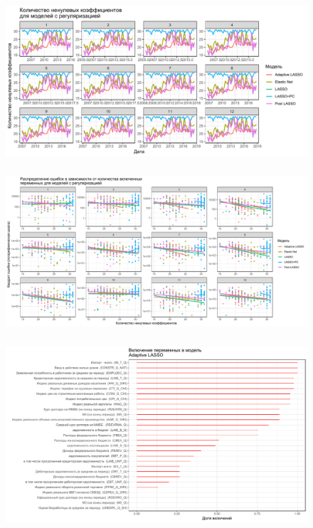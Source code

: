 \documentclass[c, dvipsnames]{beamer}  %
\begin{document}
 \begin{frame}
\frametitle{\insertsection} 
\framesubtitle{\insertsubsection}
\begin{figure}
\includegraphics[width=\linewidth]{nonzerotime.pdf}
\end{figure}
\end{frame} 


 \begin{frame}
\frametitle{\insertsection} 
\framesubtitle{\insertsubsection}
\begin{figure}
\includegraphics[width=\linewidth]{nonzeroerror.pdf}
\end{figure}
\end{frame} 

 \begin{frame}
\frametitle{\insertsection} 
\framesubtitle{\insertsubsection} 
\begin{figure}
\includegraphics[width=\linewidth]{nzlollipop1.pdf}
\end{figure}
\end{frame} 
\end{document}
